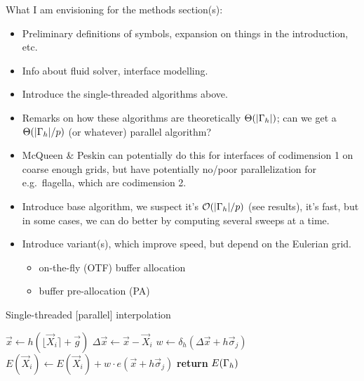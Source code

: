 \clearpage

\bgroup
\color{red}
What I am envisioning for the methods section(s):
\begin{itemize}
    \item Preliminary definitions of symbols, expansion on things in the
        introduction, etc.
    \item Info about fluid solver, interface modelling.
    \item Introduce the single-threaded algorithms above.
    \item Remarks on how these algorithms are theoretically $\Theta(|\Gamma_h|)$;
        can we get a $\Theta(|\Gamma_h|/p)$ (or whatever) parallel algorithm?
    \item McQueen \& Peskin can potentially do this for interfaces of codimension 1
        on coarse enough grids, but have potentially no/poor parallelization for
        e.g.\ flagella, which are codimension 2.
    \item Introduce base algorithm, we suspect it's $\mathcal{O}(|\Gamma_h|/p)$ (see results),
        it's fast, but in some cases, we can do better by computing several sweeps at a time.
    \item Introduce variant(s), which improve speed, but depend on the Eulerian grid.
        \begin{itemize}
            \item on-the-fly (OTF) buffer allocation
            \item buffer pre-allocation (PA)
        \end{itemize}
\end{itemize}


\begin{algorithm}
\caption{Single-threaded [parallel] interpolation}
\label{algo:par-interp}
\begin{algorithmic}

    \State $\vec{x} \gets h(\lfloor\vec{X}_i\rceil+\vec{g})$
    \State $\Delta\vec{x} \gets \vec{x}-\vec{X}_i$
        \State $w \gets \delta_h(\Delta\vec{x}+h\vec{\sigma}_j)$
        \State $E(\vec{X}_i) \gets E(\vec{X}_i) + w \cdot e(\vec{x}+h\vec{\sigma}_j)$
    \EndFor
\EndFor
\State \textbf{return} $E(\Gamma_h)$
\EndProcedure
\end{algorithmic}
\end{algorithm}

